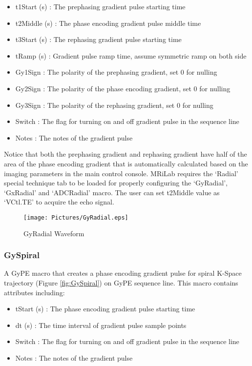 \documentclass{book}%
\begin{document}
\begin{itemize}
	\item t1Start (s) : The prephasing gradient pulse starting time
	\item t2Middle (s) : The phase encoding gradient pulse middle time
	\item t3Start (s) : The rephasing gradient pulse starting time
	\item tRamp (s) : Gradient pulse ramp time, assume symmetric ramp on both side
	\item Gy1Sign : The polarity of the prephasing gradient, set 0 for nulling
	\item Gy2Sign : The polarity of the phase encoding gradient, set 0 for nulling
  \item Gy3Sign : The polarity of the rephasing gradient, set 0 for nulling
	\item Switch : The flag for turning on and off gradient pulse in the sequence line
	\item Notes : The notes of the gradient pulse 
\end{itemize}

Notice that both the prephasing gradient and rephasing gradient have half of the area of the phase encoding gradient that is automatically calculated based on the imaging parameters in the main control console. MRiLab requires the `Radial' special technique tab to be loaded for properly configuring the `GyRadial', `GxRadial' and `ADCRadial' macro. The user can set t2Middle value as `VCtl.TE' to acquire the echo signal.

\begin{figure}[htbp]
	\centering
		\texttt{[image: Pictures/GyRadial.eps]}
	\caption{GyRadial Waveform}
	\label{fig:GyRadial}
\end{figure}

\subsubsection{GySpiral}

A GyPE macro that creates a phase encoding gradient pulse for spiral K-Space trajectory (Figure \ref{fig:GySpiral}) on GyPE sequence line. This macro contains attributes including:

\begin{itemize}
	\item tStart (s) : The phase encoding gradient pulse starting time
	\item dt (s) : The time interval of gradient pulse sample points
	\item Switch : The flag for turning on and off gradient pulse in the sequence line
	\item Notes : The notes of the gradient pulse 
\end{itemize}
\end{document}
